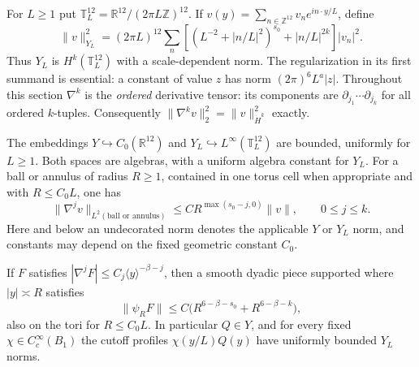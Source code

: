 For $L\ge1$ put $\mathbb T_L^{12}=\mathbb R^{12}/(2\pi L\mathbb Z)^{12}$.
If $v(y)=\sum_{n\in\mathbb Z^{12}}v_ne^{in\cdot y/L}$, define
\begin{equation}\label{lin:YL}
 \|v\|_{Y_L}^2=(2\pi L)^{12}\sum_n
 \left[(L^{-2}+|n/L|^2)^{s_0}+|n/L|^{2k}\right]|v_n|^2.
\end{equation}
Thus $Y_L$ is $H^k(\mathbb T_L^{12})$ with a scale-dependent norm.
The regularization in its first summand is essential: a constant of value
$z$ has norm $(2\pi)^6L^a|z|$.
Throughout this section $\nabla^k$ is the \emph{ordered} derivative tensor:
its components are $\partial_{j_1}\cdots\partial_{j_k}$ for all ordered
$k$-tuples.  Consequently
$\|\nabla^kv\|_2^2=\|v\|_{\dot H^k}^2$ exactly.

\begin{lemma}\label{lin:spatial}
The embeddings $Y\hookrightarrow C_0(\mathbb R^{12})$ and
$Y_L\hookrightarrow L^\infty(\mathbb T_L^{12})$ are bounded, uniformly for
$L\ge1$.  Both spaces are algebras, with a uniform algebra constant for
$Y_L$.  For a ball or annulus of radius $R\ge1$, contained in one torus
cell when appropriate and with $R\le C_0L$, one has
\begin{equation}\label{lin:local-derivatives}
 \|\nabla^jv\|_{L^2(\text{ball or annulus})}
 \le C R^{\max(s_0-j,0)}\|v\|,
 \qquad 0\le j\le k.
\end{equation}
Here and below an undecorated norm denotes the applicable $Y$ or $Y_L$
norm, and constants may depend on the fixed geometric constant $C_0$.

If $F$ satisfies $|\nabla^jF|\le C_j\langle y\rangle^{-\beta-j}$, then
a smooth dyadic piece supported where $|y|\asymp R$ satisfies
\begin{equation}\label{lin:symbol-norm}
 \|\psi_RF\|\le C\big(R^{6-\beta-s_0}+R^{6-\beta-k}\big),
\end{equation}
also on the tori for $R\le C_0L$.  In particular $Q\in Y$, and for every
fixed $\chi\in C_c^\infty(B_1)$ the cutoff profiles $\chi(y/L)Q(y)$
have uniformly bounded $Y_L$ norms.
\end{lemma}

